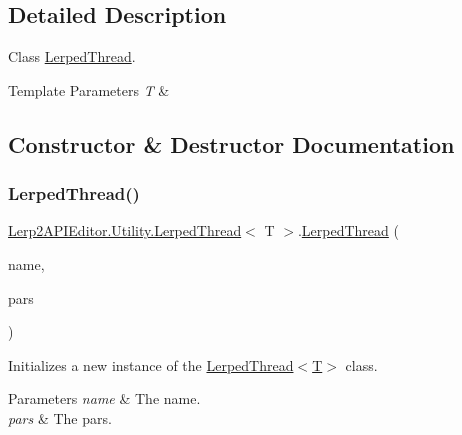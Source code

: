 \subsection{Detailed Description}
Class \hyperlink{class_lerp2_a_p_i_editor_1_1_utility_1_1_lerped_thread}{Lerped\+Thread}. 


\begin{DoxyTemplParams}{Template Parameters}
{\em T} & \\
\hline
\end{DoxyTemplParams}


\subsection{Constructor \& Destructor Documentation}
\mbox{\label{class_lerp2_a_p_i_editor_1_1_utility_1_1_lerped_thread_aacf5f152ac26f2d26e36f4473e7cda98}} 
\subsubsection{\texorpdfstring{Lerped\+Thread()}{LerpedThread()}}
{\footnotesize\ttfamily \hyperlink{class_lerp2_a_p_i_editor_1_1_utility_1_1_lerped_thread}{Lerp2\+A\+P\+I\+Editor.\+Utility.\+Lerped\+Thread}$<$ T $>$.\hyperlink{class_lerp2_a_p_i_editor_1_1_utility_1_1_lerped_thread}{Lerped\+Thread} (\begin{DoxyParamCaption}\item[{string}]{name,  }\item[{\hyperlink{class_lerp2_a_p_i_editor_1_1_utility_1_1_f_s_w_params}{F\+S\+W\+Params}}]{pars }\end{DoxyParamCaption})\hspace{0.3cm}{\ttfamily [inline]}}



Initializes a new instance of the \hyperlink{class_lerp2_a_p_i_editor_1_1_utility_1_1_lerped_thread_aacf5f152ac26f2d26e36f4473e7cda98}{Lerped\+Thread$<$\+T$>$} class. 


\begin{DoxyParams}{Parameters}
{\em name} & The name.\\
\hline
{\em pars} & The pars.\\
\hline
\end{DoxyParams}


